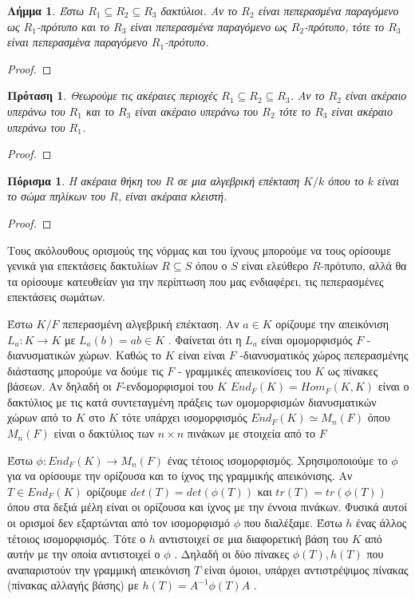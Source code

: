 \documentclass[oneside,a4paper]{article}
\newtheorem{lemma}{Λήμμα}
\newtheorem{prop}{Πρόταση}
\newtheorem{cor}{Πόρισμα}
\begin{document}
\begin{lemma} Έστω $R_1 \subseteq R_2 \subseteq R_3$ δακτύλιοι. Αν το $R_2$ είναι πεπερασμένα παραγόμενο ως $R_1$-πρότυπο και το $R_3$ είναι πεπερασμένα παραγόμενο ως $R_2$-πρότυπο, τότε το $R_3$ είναι πεπερασμένα παραγόμενο $R_1$-πρότυπο.
\end{lemma}

\begin{proof}
\end{proof}

\begin{prop} Θεωρούμε τις ακέραιες περιοχές $R_1 \subseteq R_2 \subseteq R_3$. Αν το $R_2$ είναι ακέραιο υπεράνω του $R_1$ και το $R_3$ είναι ακέραιο υπεράνω του $R_2$ τότε το $R_3$ είναι ακέραιο υπεράνω του $R_1$.
\end{prop}

\begin{proof}
\end{proof}


\begin{cor} Η ακέραια θήκη του $R$ σε μια αλγεβρική επέκταση $K/k$ όπου το $k$ είναι το σώμα πηλίκων του $R$, είναι ακέραια κλειστή.
\end{cor}

\begin{proof}
\end{proof}


Τους ακόλουθους ορισμούς της νόρμας και του ίχνους μπορούμε να τους ορίσουμε γενικά για επεκτάσεις δακτυλίων $R \subseteq S$ όπου ο $S$ είναι ελεύθερο $R$-πρότυπο, αλλά θα τα ορίσουμε κατευθείαν για την περίπτωση που μας ενδιαφέρει, τις πεπερασμένες επεκτάσεις σωμάτων.

Έστω $K/F$ πεπερασμένη αλγεβρική επέκταση. Αν $a \in K$ ορίζουμε την απεικόνιση $L_a : K \rightarrow K$ με $L_a(b) = ab \in K$ . Φαίνεται ότι η $L_a$ είναι ομομορφισμός $F$ - διανυσματικών χώρων. Καθώς το $K$ είναι είναι $F$ -διανυσματικός χώρος πεπερασμένης διάστασης μπορούμε να δούμε τις $F$ - γραμμικές απεικονίσεις του $K$ ως πίνακες βάσεων. Αν δηλαδή οι $F$-ενδομορφισμοί του $K$ $End_F(K) = Hom_F(K,K)$ είναι ο δακτύλιος με τις κατά συντεταγμένη πράξεις των ομομορφισμών διανυσματικών χώρων από το $K$ στο $K$ τότε υπάρχει ισομορφισμός $End_F (K) \simeq M_n(F)$ όπου $M_n(F)$ είναι ο δακτύλιος των $n \times n$ πινάκων με στοιχεία από το $F$

Έστω $\phi : End_F (K) \rightarrow M_n(F)$ ένας τέτοιος ισομορφισμός. Χρησιμοποιούμε το $\phi$ για να ορίσουμε την ορίζουσα και το ίχνος της γραμμικής απεικόνισης. Αν $T \in End_F (K)$ ορίζουμε $det(T) = det(\phi(T))$ και $tr(T) = tr(\phi(T))$ όπου στα δεξιά μέλη είναι οι ορίζουσα και ίχνος με την έννοια πινάκων. Φυσικά αυτοί οι ορισμοί δεν εξαρτώνται από τον ισομορφισμό $\phi$ που διαλέξαμε. Έστω $h$ ένας άλλος τέτοιος ισομορφισμός. Τότε ο $h$ αντιστοιχεί σε μια διαφορετική βάση του $K$ από αυτήν με την οποία αντιστοιχεί ο $\phi$ . Δηλαδή οι δύο πίνακες $\phi(T),h(T)$ που αναπαριστούν την γραμμική απεικόνιση $T$ είναι όμοιοι, υπάρχει αντιστρέψιμος πίνακας (πίνακας αλλαγής βάσης) με $h(T) = A^{-1} \phi(T) A$ .
\end{document}
